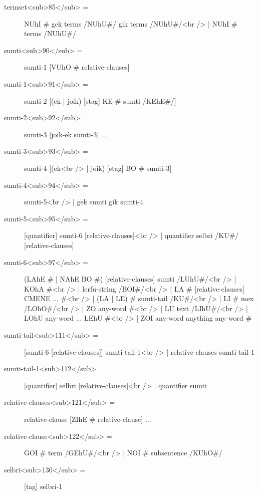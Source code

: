 \begin{description}
\hyperref[html:y85]{}
\item[termset<sub>85</sub> =] NUhI # gek terms /NUhU#/ gik terms /NUhU#/<br /> | NUhI # terms /NUhU#/ \label{html:b90}
\hyperref[html:y90]{}
\item[sumti<sub>90</sub> =] sumti-1 [VUhO # relative-clauses] \label{html:b91}
\hyperref[html:y91]{}
\item[sumti-1<sub>91</sub> =] sumti-2 [(ek | joik) [stag] KE # sumti /KEhE#/] \label{html:b92}
\hyperref[html:y92]{}
\item[sumti-2<sub>92</sub> =] sumti-3 [joik-ek sumti-3] ... \label{html:b93}
\hyperref[html:y93]{}
\item[sumti-3<sub>93</sub> =] sumti-4 [(ek<br /> | joik) [stag] BO # sumti-3] \label{html:b94}
\hyperref[html:y94]{}
\item[sumti-4<sub>94</sub> =] sumti-5<br /> | gek sumti gik sumti-4 \label{html:b95}
\hyperref[html:y95]{}
\item[sumti-5<sub>95</sub> =] [quantifier] sumti-6 [relative-clauses]<br /> | quantifier selbri /KU#/ [relative-clauses] \label{html:b97}
\hyperref[html:y97]{}
\item[sumti-6<sub>97</sub> =] (LAhE # | NAhE BO #) [relative-clauses] sumti /LUhU#/<br /> | KOhA #<br /> | lerfu-string /BOI#/<br /> | LA # [relative-clauses] CMENE ... #<br /> | (LA | LE) # sumti-tail /KU#/<br /> | LI # mex /LOhO#/<br /> | ZO any-word #<br /> | LU text /LIhU#/<br /> | LOhU any-word ... LEhU #<br /> | ZOI any-word anything any-word # \label{html:b111}
\hyperref[html:y111]{}
\item[sumti-tail<sub>111</sub> =] [sumti-6 [relative-clauses]] sumti-tail-1<br /> | relative-clauses sumti-tail-1 \label{html:b112}
\hyperref[html:y112]{}
\item[sumti-tail-1<sub>112</sub> =] [quantifier] selbri [relative-clauses]<br /> | quantifier sumti \label{html:b121}
\hyperref[html:y121]{}
\item[relative-clauses<sub>121</sub> =] relative-clause [ZIhE # relative-clause] ... \label{html:b122}
\hyperref[html:y122]{}
\item[relative-clause<sub>122</sub> =] GOI # term /GEhU#/<br /> | NOI # subsentence /KUhO#/ \label{html:b130}
\hyperref[html:y130]{}
\item[selbri<sub>130</sub> =] [tag] selbri-1 \label{html:b131}
\hyperref[html:y131]{}

\end{description}
